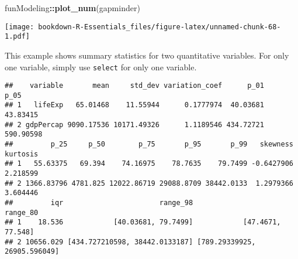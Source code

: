 \documentclass[
]{book}
\newenvironment{Shaded}{\begin{snugshade}}{\end{snugshade}}
\newcommand{\CommentTok}[1]{\textcolor[rgb]{0.56,0.35,0.01}{\textit{#1}}}
\newcommand{\DecValTok}[1]{\textcolor[rgb]{0.00,0.00,0.81}{#1}}
\newcommand{\KeywordTok}[1]{\textcolor[rgb]{0.13,0.29,0.53}{\textbf{#1}}}
\newcommand{\NormalTok}[1]{#1}
\newcommand{\OperatorTok}[1]{\textcolor[rgb]{0.81,0.36,0.00}{\textbf{#1}}}
\newcommand{\StringTok}[1]{\textcolor[rgb]{0.31,0.60,0.02}{#1}}
\begin{document}
\begin{Shaded}
\begin{Highlighting}[]
\NormalTok{funModeling}\OperatorTok{::}\KeywordTok{plot_num}\NormalTok{(gapminder)}
\end{Highlighting}
\end{Shaded}

\texttt{[image: bookdown-R-Essentials\_files/figure-latex/unnamed-chunk-68-1.pdf]}

This example shows summary statistics for two quantitative variables. For only one variable, simply use \texttt{select} for only one variable.

\begin{Shaded}
\end{Shaded}

\begin{verbatim}
##    variable       mean     std_dev variation_coef      p_01      p_05
## 1   lifeExp   65.01468    11.55944      0.1777974  40.03681  43.83415
## 2 gdpPercap 9090.17536 10171.49326      1.1189546 434.72721 590.90598
##         p_25     p_50        p_75       p_95       p_99   skewness kurtosis
## 1   55.63375   69.394    74.16975    78.7635    79.7499 -0.6427906 2.218599
## 2 1366.83796 4781.825 12022.86719 29088.8709 38442.0133  1.2979366 3.604446
##         iqr                       range_98                     range_80
## 1    18.536            [40.03681, 79.7499]            [47.4671, 77.548]
## 2 10656.029 [434.727210598, 38442.0133187] [789.29339925, 26905.596049]
\end{verbatim}

\begin{Shaded}
\end{Shaded}
\end{document}
